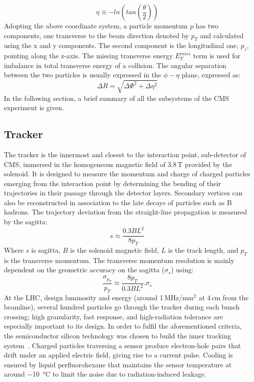 \begin{equation}
\eta \equiv -ln(tan(\frac{\theta}{2}))
\end{equation}
Adopting the above coordinate system, a particle momentum $p$ has two components, one transverse to the beam direction denoted by $p_{T}$ and calculated using the x and y components. The second component is the longitudinal one, $p_{z}$, pointing along the z-axis. The missing transverse energy $E_{T}^{miss}$ term is used for imbalance in total transverse energy of a collision. The angular separation between the two particles is usually expressed in the $\phi-\eta$ plane, expressed as:
\begin{equation}
\Delta R = \sqrt{\Delta\Phi^{2} + \Delta\eta^{2}}
\end{equation} 
In the following section, a brief summary of all the subsystems of the CMS experiment is given.

\subsection{Tracker}
The tracker is the innermost and closest to the interaction point, sub-detector of CMS, immersed in the homogeneous magnetic field of 3.8\,T provided by the solenoid. It is designed to measure the momentum and charge of charged particles emerging from the interaction point by determining the bending of their trajectories in their passage through the detector layers. Secondary vertices can also be reconstructed in association to the late decays of particles such as B hadrons. The trajectory deviation from the straight-line propagation is measured by the sagitta:
\begin{equation}
s \approx \frac{0.3BL^{2}}{8p_{T}}
\end{equation}
Where $s$ is sagitta, $B$ is the solenoid magnetic field, $L$ is the track length, and $p_{T}$ is the transverse momentum. The transverse momentum resolution is mainly dependent on the geometric accuracy on the sagitta ($\sigma_{s}$) using:
\begin{equation}
\frac{\sigma_{p_{T}}}{p_{T}} \approx \frac{8p_{T}}{0.3BL^{2}}.\sigma_{s}
\end{equation}
At the LHC, design luminosity and energy (around 1\,MHz/mm$^{2}$ at 4\,cm from the beamline), several hundred particles go through the tracker during each bunch crossing; high granularity, fast response, and high-radiation tolerance are especially important to its design. In order to fulfil the aforementioned criteria, the semiconductor silicon technology was chosen to build the inner tracking system~\cite{tracker}. Charged particles traversing a sensor produce electron-hole pairs that drift under an applied electric field, giving rise to a current pulse. Cooling is ensured by liquid perfluorohexane that maintains the sensor temperature at around \SI{-10}{\celsius} to limit the noise due to radiation-induced leakage.

